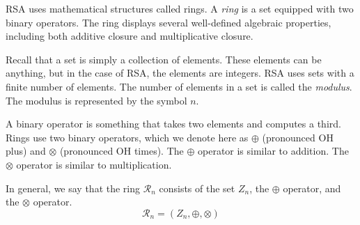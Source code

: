 
RSA uses mathematical structures called rings.
A \emph{ring} is a set equipped with two binary operators.\cite{wiki-Rings}
The ring displays several well-defined algebraic properties,
including both additive closure and multiplicative closure.

Recall that a set is simply a collection of elements.
These elements can be anything, but in the case of RSA, the elements are integers.
RSA uses sets with a finite number of elements.
The number of elements in a set is called the \emph{modulus}.
The modulus is represented by the symbol $n$.

A binary operator is something that takes two elements and computes a third.
Rings use two binary operators, which we denote here as
$\oplus$ (pronounced \textsf{OH plus}) and $\otimes$ (pronounced \textsf{OH times}).
The $\oplus$ operator is similar to addition.
The $\otimes$ operator is similar to multiplication.

In general, we say that the ring  $\mathcal{R}_n$
consists of the set $Z_n$, the $\oplus$ operator, and the $\otimes$ operator.
\[  \mathcal{R}_n = (Z_n,\oplus,\otimes)  \]

